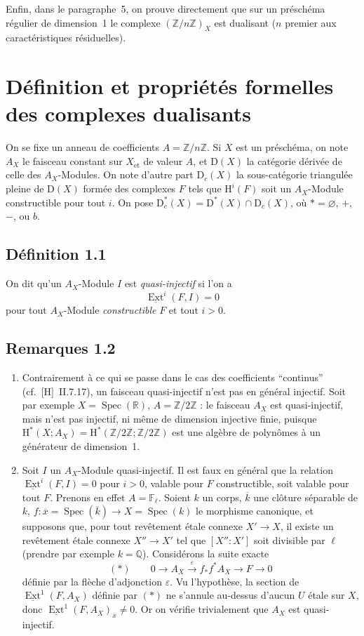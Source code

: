 \documentclass[11pt]{article}
\renewcommand{\H}{\mathrm{H}}
\DeclareMathOperator{\Ext}{Ext}
\DeclareMathOperator{\Spec}{Spec}
\newcommand{\D}{\mathrm{D}}
\newcommand{\Z}{\mathbb{Z}}
\newcommand{\F}{\mathbb{F}}
\newcommand{\Q}{\mathbb{Q}}
\newcommand{\ol}[1]{\overline{#1}}
\providecommand{\Z}{\mathbb Z}
\providecommand{\Spec}{\operatorname{Spec}}
\providecommand{\Spec}{\operatorname{Spec}}
\providecommand{\Spec}{\operatorname{Spec}}
\providecommand{\Spec}{\operatorname{Spec}}
\begin{document}
Enfin, dans le paragraphe~5, on prouve directement que sur un préschéma régulier de dimension~1 le complexe $(\Z/n\Z)_X$ est dualisant ($n$ premier aux caractéristiques résiduelles).

\section{Définition et propriétés formelles des complexes dualisants}

On se fixe un anneau de coefficients $A = \Z/n\Z$. Si $X$ est un préschéma, on note $A_X$ le faisceau constant sur $X_{\mathrm{\acute{e}t}}$ de valeur $A$, et $\D(X)$ la catégorie dérivée de celle des $A_X$-Modules. On note d'autre part $\D_c(X)$ la sous-catégorie triangulée pleine de $\D(X)$ formée des complexes $F$ tels que $\H^i(F)$ soit un $A_X$-Module constructible pour tout $i$. On pose $\D_c^{*}(X) = \D^{*}(X) \cap \D_c(X)$, où $* = \varnothing$, $+$, $-$, ou $b$.

\subsection*{Définition 1.1}
On dit qu'un $A_X$-Module $I$ est \emph{quasi-injectif} si l'on a
\[
\underline{\Ext}^i(F,I) = 0
\]
pour tout $A_X$-Module \emph{constructible} $F$ et tout $i > 0$.

\subsection*{Remarques 1.2}
\begin{enumerate}[label=\alph*)]
\item Contrairement à ce qui se passe dans le cas des coefficients ``continus'' (cf.~[H]~II.7.17), un faisceau quasi-injectif n'est pas en général injectif. Soit par exemple $X = \Spec(\mathbb{R})$, $A = \Z/2\Z$ : le faisceau $A_X$ est quasi-injectif, mais n'est pas injectif, ni même de dimension injective finie, puisque $\H^{*}(X; A_X) = \H^{*}(\Z/2\Z; \Z/2\Z)$ est une algèbre de polynômes à un générateur de dimension~1.

\item Soit $I$ un $A_X$-Module quasi-injectif. Il est faux en général que la relation $\underline{\Ext}^i(F,I) = 0$ pour $i > 0$, valable pour $F$ constructible, soit valable pour tout $F$. Prenons en effet $A = \F_{\ell}$. Soient $k$ un corps, $\ol{k}$ une clôture séparable de $k$, $f : \ol{x} = \Spec(\ol{k}) \to X = \Spec(k)$ le morphisme canonique, et supposons que, pour tout revêtement étale connexe $X' \to X$, il existe un revêtement étale connexe $X'' \to X'$ tel que $[X'':X']$ soit divisible par $\ell$ (prendre par exemple $k = \Q$). Considérons la suite exacte
\[
(*) \qquad 0 \longrightarrow A_X \xrightarrow{\;\varepsilon\;} f_{*}f^{*}A_X \longrightarrow F \longrightarrow 0
\]
définie par la flèche d'adjonction $\varepsilon$. Vu l'hypothèse, la section de $\underline{\Ext}^1(F,A_X)$ définie par $(*)$ ne s'annule au-dessus d'aucun $U$ étale sur $X$, donc $\underline{\Ext}^1(F,A_X)_{\ol{x}} \neq 0$. Or on vérifie trivialement que $A_X$ est quasi-injectif.
\end{enumerate}
\end{document}
